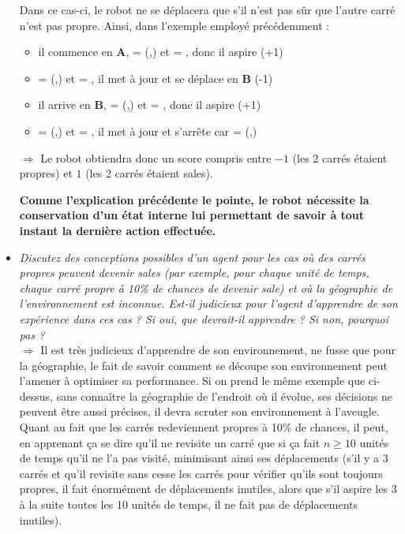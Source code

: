 \documentclass{article}
\newcommand{\term}[1]{\textit{\textcolor{maintitle}{#1}}}
\begin{document}
\begin{sffamily}
\begin{itemize}
Dans ce cas-ci, le robot ne se déplacera que s'il n'est pas sûr que l'autre carré n'est pas propre. Ainsi, dans l'exemple employé 
précédemment :
\begin{itemize}
\item il commence en \textbf{A},  = (,) et  = , donc il aspire 
(+1)
\item {} = (,) et  = , il met  à jour et se 
déplace en \textbf{B} (-1)
\item il arrive en \textbf{B},  = (,) et  = , donc il aspire
(+1)
\item {} = (,) et  = , il met  à jour et 
s'arrête car  = (,)
\end{itemize}

$\Rightarrow$ Le robot obtiendra donc un score compris entre $-1$ (les 2 carrés étaient propres) et $1$ (les 2 carrés étaient 
sales).

\textbf{Comme l'explication précédente le pointe, le robot nécessite la conservation d'un état interne lui permettant de savoir
à tout instant la dernière action effectuée.} \\

\item \term{Discutez des conceptions possibles d'un agent pour les cas où des carrés propres peuvent devenir sales
(par exemple, pour chaque unité de temps, chaque carré propre à 10\% de chances de devenir sale) et où la géographie
de l'environnement est inconnue. Est-il judicieux pour l'agent d'apprendre de son expérience dans ces cas ? Si oui,
que devrait-il apprendre ? Si non, pourquoi pas ?} \\

$\Rightarrow$ Il est très judicieux d'apprendre de son environnement, ne fusse que pour la géographie, le fait de savoir comment se
découpe son environnement peut l'amener à optimiser sa performance. Si on prend le même exemple que ci-dessus, sans connaître la
géographie de l'endroit où il évolue, ses décisions ne peuvent être aussi précises, il devra scruter son environnement à l'aveugle.
Quant au fait que les carrés redeviennent propres à 10\% de chances, il peut, en apprenant ça se dire qu'il ne revisite un carré 
que si ça fait $n \geq 10$ unités de temps qu'il ne l'a pas visité, minimisant ainsi ses déplacements (s'il y a 3 carrés et qu'il 
revisite sans cesse les carrés pour vérifier qu'ils sont toujours propres, il fait énormément de déplacements inutiles, alors que 
s'il aspire les 3 à la suite toutes les 10 unités de temps, il ne fait pas de déplacements inutiles).
\end{itemize}


\end{sffamily}
\end{document}
